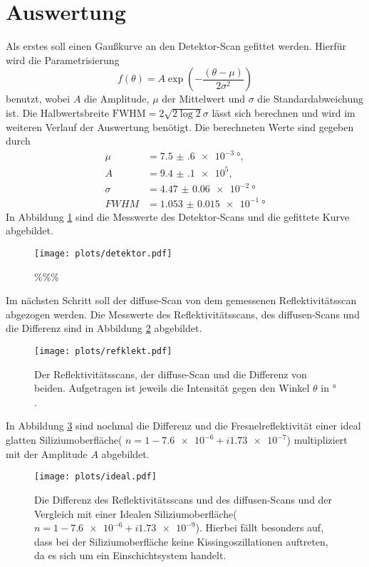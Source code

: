 \section{Auswertung}
Als erstes soll einen Gaußkurve an den Detektor-Scan gefittet werden.
Hierfür wird die Parametrisierung
\begin{equation*}
    f(\theta) = A\exp\left( - \frac{( \theta - \mu)}{2\sigma^2} \right)
\end{equation*} 
benutzt, wobei $A$ die Amplitude, $\mu$ der Mittelwert und $\sigma$ die Standardabweichung ist.
Die Halbwertsbreite $\text{FWHM} = 2\sqrt{2\log2}\sigma$ lässt sich berechnen und wird im weiteren Verlauf der Auswertung benötigt.
Die berechneten Werte sind gegeben durch
\begin{align*}
    \mu &= \SI{7.5(6)e-3}{\degree}, \\
    A &= \num{9.4(1)e5}, \\
    \sigma &= \SI{4.47(6)e-2}{\degree} \\
    FWHM &= \SI{1.053(15)e-1}{\degree}
\end{align*}
In Abbildung \ref{fig:Detektor} sind die Messwerte des Detektor-Scans und die gefittete Kurve abgebildet.
\begin{figure}
    \centering
    \texttt{[image: plots/detektor.pdf]}
    \caption{\%\%\%}
    \label{fig:Detektor}
\end{figure}
Im nächsten Schritt soll der diffuse-Scan von dem gemessenen Reflektivitätsscan abgezogen werden. Die Messwerte des Reflektivitätsscans, des diffusen-Scans und die Differenz sind in Abbildung \ref{fig:reflekt} abgebildet.
\begin{figure}
    \centering 
    \texttt{[image: plots/refklekt.pdf]}
    \caption{Der Reflektivitätsscans, der diffuse-Scan und die Differenz von beiden. Aufgetragen ist jeweils die Intensität gegen den Winkel $\theta $ in $\si{\degree}$. }
    \label{fig:reflekt}
\end{figure}
In Abbildung \ref{fig:silicium} sind nochmal die Differenz und die Fresnelreflektivität einer ideal glatten Siliziumoberfläche( $n = 1- \num{7.6e-6} + i\num{1.73e-7} $\cite{skript}) multipliziert mit der Amplitude $A$ abgebildet.
\begin{figure}
    \centering 
    \texttt{[image: plots/ideal.pdf]}
    \caption{Die Differenz des Reflektivitätsscans und des diffusen-Scans und der Vergleich mit einer Idealen Siliziumoberfläche( $n = 1- \num{7.6e-6} + i\num{1.73e-9} $). Hierbei fällt besonders auf, dass bei der Siliziumoberfläche keine Kissingoszillationen auftreten, da es sich um ein Einschichtsystem handelt.   }
    \label{fig:silicium}
\end{figure}

